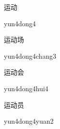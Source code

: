 \begin{multicols*}{2}
\begin{verbete}{运动}
\begin{pronuncia}{yun4dong4}
\end{pronuncia}
\end{verbete}

\begin{verbete}{运动场}
\begin{pronuncia}{yun4dong4chang3}
\end{pronuncia}
\end{verbete}

\begin{verbete}{运动会}
\begin{pronuncia}{yun4dong4hui4}
\end{pronuncia}
\end{verbete}

\begin{verbete}{运动员}
\begin{pronuncia}{yun4dong4yuan2}
\end{pronuncia}
\end{verbete}

\end{multicols*}
